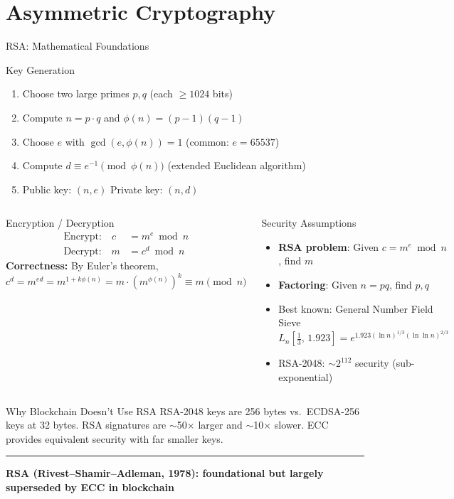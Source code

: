 \documentclass[8pt,aspectratio=169]{beamer}
\newcommand{\bottomnote}[1]{\vfill\vspace{-2mm}\textcolor{mllavender2}{\rule{\textwidth}{0.4pt}}\vspace{1mm}\footnotesize\textbf{#1}}
\begin{document}
\section{Asymmetric Cryptography}

\begin{frame}{RSA: Mathematical Foundations}
\begin{block}{Key Generation}
\begin{enumerate}\small
  \item Choose two large primes $p, q$ (each $\geq 1024$ bits)
  \item Compute $n = p \cdot q$ \quad and \quad $\phi(n) = (p-1)(q-1)$
  \item Choose $e$ with $\gcd(e, \phi(n)) = 1$ \quad (common: $e = 65537$)
  \item Compute $d \equiv e^{-1} \pmod{\phi(n)}$ \quad (extended Euclidean algorithm)
  \item Public key: $(n, e)$ \qquad Private key: $(n, d)$
\end{enumerate}
\end{block}
\vspace{1mm}
\begin{columns}
\begin{block}{Encryption / Decryption}
\begin{align*}
  \text{Encrypt:} \quad c &= m^e \bmod n \\
  \text{Decrypt:} \quad m &= c^d \bmod n
\end{align*}
\textbf{Correctness:} By Euler's theorem,
\[
  c^d = m^{ed} = m^{1 + k\phi(n)} = m \cdot (m^{\phi(n)})^k \equiv m \pmod{n}
\]
\end{block}
\begin{block}{Security Assumptions}
\begin{itemize}\small
  \item \textbf{RSA problem}: Given $c = m^e \bmod n$, find $m$
  \item \textbf{Factoring}: Given $n = pq$, find $p, q$
  \item Best known: General Number Field Sieve
    \[
      L_n\!\left[\tfrac{1}{3},\, 1.923\right] = e^{1.923(\ln n)^{1/3}(\ln \ln n)^{2/3}}
    \]
  \item RSA-2048: $\sim 2^{112}$ security (sub-exponential)
\end{itemize}
\end{block}
\end{columns}
\vspace{1mm}
\begin{alertblock}{Why Blockchain Doesn't Use RSA}
\small RSA-2048 keys are 256 bytes vs.\ ECDSA-256 keys at 32 bytes. RSA signatures are $\sim$50$\times$ larger and $\sim$10$\times$ slower. ECC provides equivalent security with far smaller keys.
\end{alertblock}
\bottomnote{RSA (Rivest--Shamir--Adleman, 1978): foundational but largely superseded by ECC in blockchain}
\end{frame}
\end{document}
